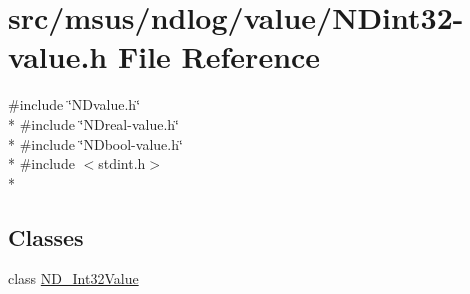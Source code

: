\hypertarget{_n_dint32-value_8h}{\section{src/msus/ndlog/value/\-N\-Dint32-\/value.h File Reference}
\label{_n_dint32-value_8h}
}
{\ttfamily \#include \char`\"{}N\-Dvalue.\-h\char`\"{}}\\*
{\ttfamily \#include \char`\"{}N\-Dreal-\/value.\-h\char`\"{}}\\*
{\ttfamily \#include \char`\"{}N\-Dbool-\/value.\-h\char`\"{}}\\*
{\ttfamily \#include $<$stdint.\-h$>$}\\*
\subsection*{Classes}
\begin{DoxyCompactItemize}
\item 
class \hyperlink{class_n_d___int32_value}{N\-D\-\_\-\-Int32\-Value}
\end{DoxyCompactItemize}
